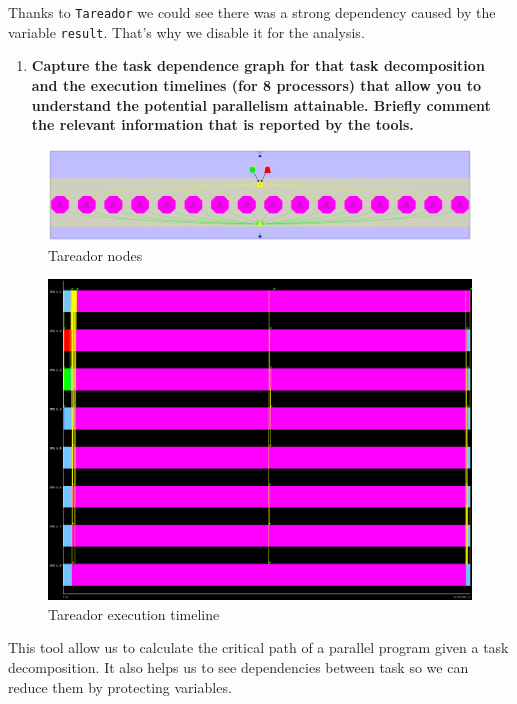 \documentclass[a4paper]{article}
\begin{document}
Thanks to \texttt{Tareador} we could see there was a strong dependency caused by the variable \texttt{result}. That’s why we disable it for the analysis.

\begin{enumerate}[resume]
	\item \textbf{Capture the task dependence graph for that task decomposition and the execution timelines (for 8 processors) that allow you to understand the potential parallelism attainable. Briefly comment the relevant information that is reported by the tools.}
\end{enumerate}

\begin{figure}[H]
    \centering
    \includegraphics[width=\textwidth]{image03}
    \caption{Tareador nodes}
    \label{fig:tareador_nodes}
\end{figure}
\begin{figure}[H]
    \centering
    \includegraphics[width=\textwidth]{image02}
    \caption{Tareador execution timeline}
    \label{fig:tareador_timeline}
\end{figure}

This tool allow us to calculate the critical path of a parallel program given a task decomposition. It also helps us to see dependencies between task so we can reduce them by protecting variables.
\end{document}
